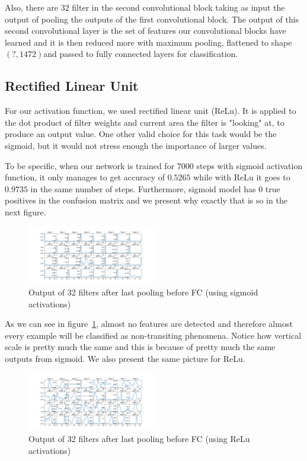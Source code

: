 \documentclass[twoside]{article}
\begin{document}
\begin{multicols}{2}
Also, there are $32$ filter in the second convolutional block taking as input the output of pooling the outputs of the first convolutional block. The output of this second convolutional layer is the set of features our convolutional blocks have learned and it is then reduced more with maximum pooling, flattened to shape $(?,1472) $and passed to fully connected layers for classification.

\subsection{Rectified Linear Unit}
For our activation function, we used rectified linear unit (ReLu). It is applied to the dot product of filter weights and current area the filter is "looking" at, to produce an output value. One other valid choice for this task would be the sigmoid, but it would not stress enough the importance of larger values.

To be specific, when our network is trained for $7000$ steps with sigmoid activation function, it only manages to get accuracy of $0.5265$ while with ReLu it goes to $0.9735$ in the same number of steps. Furthermore, sigmoid model has $0$ true positives in the confusion matrix and we present why exactly that is so in the next figure.
\begin{figure}[H]
\includegraphics[width=0.5\textwidth]{sigmoid_pooling2}
\caption{Output of 32 filters after last pooling before FC (using sigmoid activations)}
\label{fig:sigmoid-pool2}
\end{figure}

As we can see in figure~\ref{fig:sigmoid-pool2}, almost no features are detected and therefore almost every example will be classified as non-transiting phenomena. Notice how vertical scale is pretty much the same and this is because of pretty much the same outputs from sigmoid. We also present the same picture for ReLu.
\begin{figure}[H]
\includegraphics[width=0.5\textwidth]{relu_pooling2}
\caption{Output of 32 filters after last pooling before FC (using ReLu activations)}
\label{fig:relu-pool2}
\end{figure}


\end{multicols}
\end{document}
